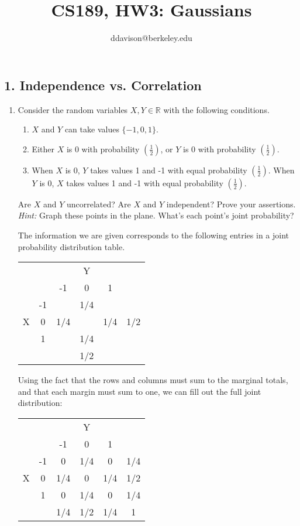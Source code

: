 \documentclass{article}
\title{CS189, HW3: Gaussians}
\author{ddavison@berkeley.edu}
\date{}
\renewcommand{\R}{\mathbb{R}}
\begin{document}
\maketitle

\subsection*{1. Independence vs. Correlation}
\begin{enumerate}[label=(\alph*)]
    \item Consider the random variables $X, Y \in \R$ with the following conditions.
    \begin{enumerate}[label=(\roman*)]
        \item $X$ and $Y$ can take values $\{-1, 0, 1\}$.
        \item Either $X$ is 0 with probability $(\frac{1}{2})$, or $Y$ is 0 with probability $(\frac{1}{2})$.
        \item When $X$ is 0, $Y$ takes values 1 and -1 with equal probability $(\frac{1}{2})$. When $Y$ is 0, $X$ takes values 1 and -1 with equal probability $(\frac{1}{2})$.
    \end{enumerate}

    Are $X$ and $Y$ uncorrelated? Are $X$ and $Y$ independent? Prove your
    assertions. \emph{Hint:} Graph these points in the plane. What’s each
    point’s joint probability?

    \begin{mdframed}
      The information we are given corresponds to the following entries in a
      joint probability distribution table.

      \begin{tabular}{c | c | c | c | c | c}
        &    &     & Y   &     & \\
        &    &  -1 & 0   &   1 & \\
        \hline
        & -1 &     & 1/4 &     & \\
        X &  0 & 1/4 &     & 1/4 & 1/2 \\
        &  1 &     & 1/4 &     & \\
        \hline
        &    &     & 1/2 &     & \\
      \end{tabular}

      Using the fact that the rows and columns must sum to the marginal totals,
      and that each margin must sum to one, we can fill out the full joint
      distribution:

      \begin{tabular}{c | c | c | c | c | c}
        &    &     & Y   &     & \\
        &    &  -1 & 0   &   1 & \\
        \hline
        & -1 & 0   & 1/4 & 0   & 1/4\\
      X &  0 & 1/4 & 0   & 1/4 & 1/2 \\
        &  1 &  0  & 1/4 & 0   & 1/4 \\
        \hline
        &    & 1/4 & 1/2 & 1/4 & 1 \\
      \end{tabular}


\end{mdframed}
\end{enumerate}
\end{document}
